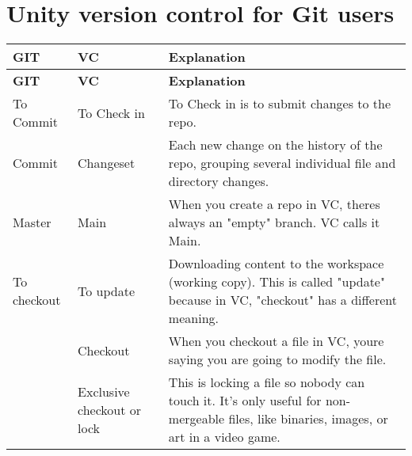 \chapter{Unity version control for Git users}
\hypertarget{md__hey_tea_9_2_library_2_package_cache_2com_8unity_8collab-proxy_0d2_80_85_2_documentation_0i_2_git_users}{}\label{md__hey_tea_9_2_library_2_package_cache_2com_8unity_8collab-proxy_0d2_80_85_2_documentation_0i_2_git_users}
\label{md__hey_tea_9_2_library_2_package_cache_2com_8unity_8collab-proxy_0d2_80_85_2_documentation_0i_2_git_users_autotoc_md869}%
%


\tabulinesep=1mm
\begin{longtabu}spread 0pt [c]{*{3}{|X[-1]}|}
\hline
\cellcolor{\tableheadbgcolor}\textbf{ {\bfseries{GIT}}   }&\cellcolor{\tableheadbgcolor}\textbf{ {\bfseries{ VC}}   }&\cellcolor{\tableheadbgcolor}\textbf{ {\bfseries{Explanation}}    }\\
\endfirsthead
\hline
\endfoot
\hline
\cellcolor{\tableheadbgcolor}\textbf{ {\bfseries{GIT}}   }&\cellcolor{\tableheadbgcolor}\textbf{ {\bfseries{ VC}}   }&\cellcolor{\tableheadbgcolor}\textbf{ {\bfseries{Explanation}}    }\\
\endhead
To Commit   &To Check in   &To Check in is to submit changes to the repo.    \\
Commit   &Changeset   &Each new change on the history of the repo, grouping several individual file and directory changes.    \\
Master   &Main   &When you create a repo in  VC, there\textquotesingle{}s always an "{}empty"{} branch.  VC calls it Main.    \\
To checkout   &To update   &Downloading content to the workspace (working copy). This is called "{}update"{} because in  VC, "{}checkout"{} has a different meaning.    \\
&Checkout   &When you checkout a file in  VC, you\textquotesingle{}re saying you are going to modify the file.    \\
&Exclusive checkout or lock   &This is locking a file so nobody can touch it. It’s only useful for non-\/mergeable files, like binaries, images, or art in a video game.    \\

\end{longtabu}
